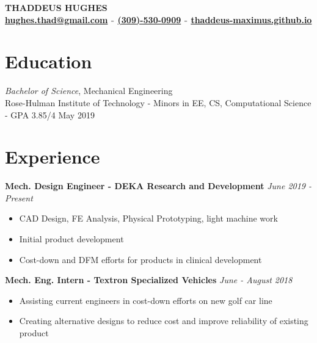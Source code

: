 \documentclass[9pt]{article}
\begin{document}
\thispagestyle{empty} %

\sffamily
\raggedright

{\bf \fontsize{18}{20}\selectfont THADDEUS HUGHES \\ \sf \fontsize{12}{20}\selectfont \textcolor{gray}{ \href{mailto:hughes.thad@gmail.com}{hughes.thad@gmail.com} - \href{13095300909}{(309)-530-0909} - \href{http://thaddeus-maximus.github.io}{thaddeus-maximus.github.io}} }

\vspace{-8pt} 
 
\section*{Education}
\vspace{4pt} 
{\sl Bachelor of Science}, Mechanical Engineering\\
Rose-Hulman Institute of Technology - Minors in EE, CS, Computational Science - GPA 3.85/4 \hfill May 2019 \\

\vspace{-8pt}
  
\section*{Experience} 
\vspace{4pt}

{\bf Mech. Design Engineer - DEKA Research and Development} \hfill        {\sl June 2019 - Present} \\
   \vspace{-6pt} \begin{itemize} \itemsep -2pt %
   \item CAD Design, FE Analysis, Physical Prototyping, light machine work
   \item Initial product development
   \item Cost-down and DFM efforts for products in clinical development
 \end{itemize}

{\bf Mech. Eng. Intern - Textron Specialized Vehicles} \hfill {\sl June - August 2018 }\\
   \vspace{-6pt} \begin{itemize} \itemsep -2pt %
   \item Assisting current engineers in cost-down efforts on new golf car line
   \item Creating alternative designs to reduce cost and improve reliability of existing product
 \end{itemize}
\end{document}
